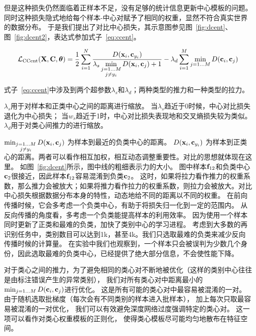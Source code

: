 但是这种损失仍然面临着正样本不足，没有足够的统计信息更新中心模板的问题。
同时这种损失隐式地给每个样本-中心对赋予了相同的权重，显然不符合真实世界的数据分布。
于是我们提出了对比中心损失，其示意图参见图~\ref{fig:dcent}、图~\ref{fig:dcent2}，表达式参加式子~\ref{eq:ccent}。

\begin{equation}
	\mathcal{L}_{\textrm{CCent}} ({\mathbf{X}}, {\mathbf{C}}, {\boldsymbol{\theta}}) = \frac{1}{2}
	\sum_{i=1}^{N}
	\frac{D(
		{\mathbf{x}}_{i}, {\mathbf{c}}_{y_i}
		)}{ 
		\displaystyle \lambda_s
		\min_{\substack{
				j=1...M \\
				j \neq y_i }}
		D(
		{\mathbf{x}}_{i}, {\mathbf{c}}_{j}
		) + 1 }
	-
	\lambda_d \sum_{i=1}^{M}  \min_{j=1...M} D({\mathbf{c}}_i,{\mathbf{c}}_j)
	\label{eq:ccent}
\end{equation}

式子~\ref{eq:ccent}中涉及到两个超参数$\lambda_s$和$\lambda_d$；两种类型的推力和一种类型的拉力。

$\lambda_s$用于对样本和正类中心之间的距离进行缩放。
当$\lambda_s$趋近于0时候，中心对比损失退化为中心损失；
当$w_s$趋近于1时，中心对比损失表现地和交叉熵损失较为类似。
$\lambda_d$用于对类心间推力的进行缩放。

$\min_{\substack{
			j=1...M \\
			j \neq y_i }} D(
	{\mathbf{x}}_{i}, {\mathbf{c}}_{j}
	)$
为样本到最近的负类中心的距离。
$D(
	{\mathbf{x}}_{i}, {\mathbf{c}}_{y_i}
	)$
为样本到正类心的距离。两者可以看作相互加权，相互动态调整重要性。对比的思想就体现在这里。
如图~\ref{fig:dcent}所示，图中线的粗细表示力的大小。
图中样本${\mathbf{f}}_{12}$和负类中心${\mathbf{c}}_2$很接近，因此样本${\mathbf{f}}_{12}$容易混淆到负类${\mathbf{c}}_2$。
这时，如果将拉力看作推力的权重系数，那么推力会被放大；如果将推力看作拉力的权重系数，则拉力会被放大。对比中心损失根据数据分布本身的特性，动态地给不同的距离以不同的权重。
在前向传播时候，它会多考虑一个负类中心，有助于将损失归一化到一定的范围内。
从反向传播的角度看，多考虑一个负类能提高样本的利用效率。
因为使用一个样本同时更新了正类和最难的负类，加快了类别中心的学习进程。
考虑到大多数的再识别任务中，类别数目可以达到1k，甚至4k。我们只选取最难的负类来减少反向传播时候的计算量。
在实验中我们也观察到，一个样本只会被误判为少数几个身份，因此选取最难的负类中心，已经提供了绝大部分信息，不会使性能下降。

对于类心之间的推力，为了避免相同的类心对不断地被优化（这样的类别中心往往是由标注错误产生的异常类别），
我们对所有类心对中距离最小的$\min_{j=1...M} D({\mathbf{c}}_i,{\mathbf{c}}_j)$进行优化。
这是所有可能的类心对中最容易被混淆的一对。
由于随机选取批梯度（每次会有不同类别的样本进入批样本），
加上每次只取最容易被混淆的一对优化，
我们可以有效避免深度网络过度强调特定的类心对。
这一项可以看作对类心权重模板的正则化，
使得类心模板尽可能均匀地散布在特征空间。


